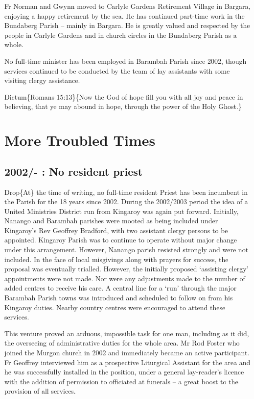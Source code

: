 Fr Norman and Gwynn moved to Carlyle Gardens Retirement Village in Bargara, enjoying a happy retirement by the sea. He has continued part-time work in the Bundaberg Parish -- mainly in Bargara. He is greatly valued and respected by the people in Carlyle Gardens and in church circles in the Bundaberg Parish as a whole.

No full-time minister has been employed in Barambah Parish since 2002, though services continued to be conducted by the team of lay assistants with some visiting clergy assistance.

Dictum\{Romans 15:13\}\{Now the God of hope fill you with all joy and peace in believing, that ye may abound in hope, through the power of the Holy Ghost.\}

\hypertarget{more-troubled-times}{%
\chapter{More Troubled Times}\label{more-troubled-times}}

\hypertarget{no-resident-priest}{%
\section{2002/- : No resident priest}\label{no-resident-priest}}

Drop\{At\} the time of writing, no full-time resident Priest has been incumbent in the Parish for the 18 years since 2002. During the 2002/2003 period the idea of a United Ministries District run from Kingaroy was again put forward. Initially, Nanango and Barambah parishes were mooted as being included under Kingaroy's Rev Geoffrey Bradford, with two assistant clergy persons to be appointed. Kingaroy Parish was to continue to operate without major change under this arrangement. However, Nanango parish resisted strongly and were not included. In the face of local misgivings along with prayers for success, the proposal was eventually trialled. However, the initially proposed `assisting clergy' appointments were not made. Nor were any adjustments made to the number of added centres to receive his care. A central line for a `run' through the major Barambah Parish towns was introduced and scheduled to follow on from his Kingaroy duties. Nearby country centres were encouraged to attend these services.

This venture proved an arduous, impossible task for one man, including as it did, the overseeing of administrative duties for the whole area. Mr Rod Foster who joined the Murgon church in 2002 and immediately became an active participant. Fr Geoffrey interviewed him as a prospective Liturgical Assistant for the area and he was successfully installed in the position, under a general lay-reader's licence with the addition of permission to officiated at funerals -- a great boost to the provision of all services.

